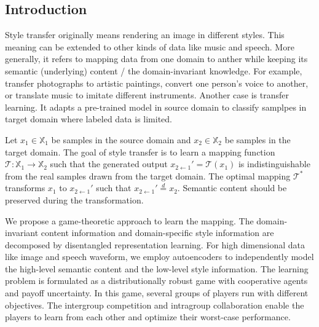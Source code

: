 \documentclass{article}
\begin{document}

\subsection{Introduction}
Style transfer originally means rendering an image in different styles. This meaning can be extended to other kinds of data like music and speech. More generally, it refers to mapping data from one domain to anther while keeping {\color{blue} its semantic (underlying) content / the domain-invariant knowledge}. For example, transfer photographs to artistic paintings, convert one person's voice to another, or translate music to imitate different instruments. Another case is transfer learning. It adapts a pre-trained model in source domain to classify samplpes in target domain where labeled data is limited.

Let $x_1 \in \mathbb{X}_1$ be samples in the source domain and $x_2 \in \mathbb{X}_2$ be samples in the target domain. The goal of {\color{blue} style} transfer is to learn a mapping function $\mathcal{T}: \mathbb{X}_1 \rightarrow \mathbb{X}_2$ such that the generated output $x_{2\leftarrow1}' = \mathcal{T}(x_1)$ is indistinguishable from the real samples drawn from the target domain. The optimal mapping $\mathcal{T}^*$ transforms $x_1$ to $x_{2\leftarrow1}'$ such that $x_{2\leftarrow1}' \overset{d}{=} x_2$. Semantic content should be preserved during the transformation.

We propose a game-theoretic approach to learn the mapping. The domain-invariant content information and domain-specific style information are decomposed by disentangled representation learning. For high dimensional data like image and speech waveform, we employ autoencoders to independently model the high-level semantic content and the low-level style information. The learning problem is formulated as a distributionally robust game with {\color{blue} cooperative agents} and payoff uncertainty. In this game, several groups of players run with different objectives. The intergroup competition and intragroup collaboration enable the players to learn from each other and optimize their worst-case performance.
\end{document}
